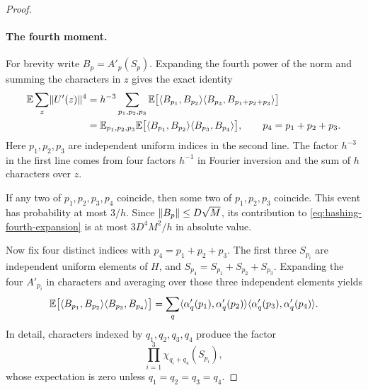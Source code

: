 \begin{proof}
\paragraph{The fourth moment.}
For brevity write $B_p=A'_p(S_p)$.  Expanding the fourth power of the norm
and summing the characters in $z$ gives the exact identity
\begin{align}
 \mathbb E\sum_z\lVert U'(z)\rVert^4
 &=h^{-3}\sum_{p_1,p_2,p_3}
   \mathbb E\bigl[\langle B_{p_1},B_{p_2}\rangle
                  \langle B_{p_3},B_{p_1+p_2+p_3}\rangle\bigr]\notag\\
 &=\mathbb E_{p_1,p_2,p_3}\mathbb E
   \bigl[\langle B_{p_1},B_{p_2}\rangle\langle B_{p_3},B_{p_4}\rangle\bigr],
 \qquad p_4=p_1+p_2+p_3.
 \label{eq:hashing-fourth-expansion}
\end{align}
Here $p_1,p_2,p_3$ are independent uniform indices in the second line.
The factor $h^{-3}$ in the first line comes from four factors $h^{-1}$
in Fourier inversion and the sum of $h$ characters over $z$.

If any two of $p_1,p_2,p_3,p_4$ coincide, then some two of
$p_1,p_2,p_3$ coincide.  This event has probability at most $3/h$.
Since $\lVert B_p\rVert\le D\sqrt M$, its contribution to
\eqref{eq:hashing-fourth-expansion} is at most $3D^4M^2/h$ in absolute value.

Now fix four distinct indices with $p_4=p_1+p_2+p_3$.  The first three
$S_{p_i}$ are independent uniform elements of $H$, and
$S_{p_4}=S_{p_1}+S_{p_2}+S_{p_3}$.  Expanding the four $A'_{p_i}$ in
characters and averaging over those three independent elements yields
\begin{equation}\label{eq:hashing-common-character}
 \mathbb E\bigl[\langle B_{p_1},B_{p_2}\rangle\langle B_{p_3},B_{p_4}\rangle\bigr]
 =\sum_q
   \langle \alpha'_q(p_1),\alpha'_q(p_2)\rangle
   \langle \alpha'_q(p_3),\alpha'_q(p_4)\rangle.
\end{equation}
In detail, characters indexed by $q_1,q_2,q_3,q_4$ produce the factor
\[
 \prod_{i=1}^3\chi_{q_i+q_4}(S_{p_i}),
\]
whose expectation is zero unless $q_1=q_2=q_3=q_4$.


\end{proof}

